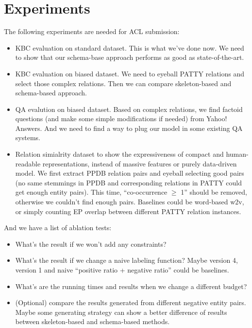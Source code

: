 \section{Experiments}
\label{sec:eval}

The following experiments are needed for ACL submission:
\begin{itemize}
  \item KBC evaluation on standard dataset. This is what we've done
        now. We need to show that our schema-base approach performs
		as good as state-of-the-art.
  \item KBC evaluation on biased dataset. We need to eyeball PATTY
        relations and select those complex relations. Then we can
		compare skeleton-based and schema-based approach.
  \item QA evalution on biased dataset. Based on complex relations,
        we find factoid questions (and make some simple modifications
		if needed) from Yahoo! Answers. And we need to find a way
		to plug our model in some existing QA systems.
  \item Relation simialrity dataset to show the expressiveness of
        compact and human-readable representations, instead of
		massive features or purely data-driven model. 
		We first extract PPDB relation pairs and eyeball selecting 
		good pairs (no same stemmings in PPDB and corresponding 
		relations in PATTY could get enough entity pairs).
		This time, ``co-occurrence $\geq$ 1'' should be removed, 
		otherwise we couldn't find enough pairs.
		Baselines could be word-based w2v, or simply counting EP
		overlap between different PATTY relation instances.
\end{itemize}

And we have a list of ablation tests:
\begin{itemize}
  \item What's the result if we won't add any constraints?
  \item What's the result if we change a naive labeling function?
        Maybe version 4, version 1 and naive ``positive ratio + 
		negative ratio'' could be baselines.
  \item What's are the running times and results when we change a
        different budget?
  \item (Optional) compare the results generated from different
        negative entity pairs. Maybe some generating strategy can
		show a better difference of results between skeleton-based
		and schema-based methods.
\end{itemize}



